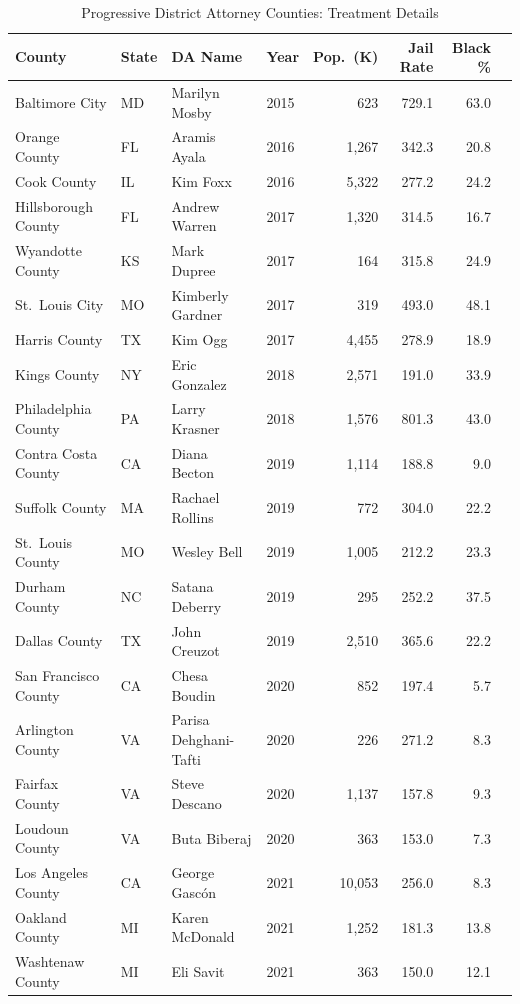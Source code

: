 \begin{table}[ht]
\centering
\small
\caption{Progressive District Attorney Counties: Treatment Details}
\label{tab:treatment}
\begin{tabular}{llllrrrr}
\toprule
County & State & DA Name & Year & Pop.\ (K) & Jail Rate & Black \% \\
\midrule
Baltimore City & MD & Marilyn Mosby & 2015 & 623 & 729.1 & 63.0 \\
Orange County & FL & Aramis Ayala & 2016 & 1,267 & 342.3 & 20.8 \\
Cook County & IL & Kim Foxx & 2016 & 5,322 & 277.2 & 24.2 \\
Hillsborough County & FL & Andrew Warren & 2017 & 1,320 & 314.5 & 16.7 \\
Wyandotte County & KS & Mark Dupree & 2017 & 164 & 315.8 & 24.9 \\
St.\ Louis City & MO & Kimberly Gardner & 2017 & 319 & 493.0 & 48.1 \\
Harris County & TX & Kim Ogg & 2017 & 4,455 & 278.9 & 18.9 \\
Kings County & NY & Eric Gonzalez & 2018 & 2,571 & 191.0 & 33.9 \\
Philadelphia County & PA & Larry Krasner & 2018 & 1,576 & 801.3 & 43.0 \\
Contra Costa County & CA & Diana Becton & 2019 & 1,114 & 188.8 & 9.0 \\
Suffolk County & MA & Rachael Rollins & 2019 & 772 & 304.0 & 22.2 \\
St.\ Louis County & MO & Wesley Bell & 2019 & 1,005 & 212.2 & 23.3 \\
Durham County & NC & Satana Deberry & 2019 & 295 & 252.2 & 37.5 \\
Dallas County & TX & John Creuzot & 2019 & 2,510 & 365.6 & 22.2 \\
San Francisco County & CA & Chesa Boudin & 2020 & 852 & 197.4 & 5.7 \\
Arlington County & VA & Parisa Dehghani-Tafti & 2020 & 226 & 271.2 & 8.3 \\
Fairfax County & VA & Steve Descano & 2020 & 1,137 & 157.8 & 9.3 \\
Loudoun County & VA & Buta Biberaj & 2020 & 363 & 153.0 & 7.3 \\
Los Angeles County & CA & George Gasc\'on & 2021 & 10,053 & 256.0 & 8.3 \\
Oakland County & MI & Karen McDonald & 2021 & 1,252 & 181.3 & 13.8 \\
Washtenaw County & MI & Eli Savit & 2021 & 363 & 150.0 & 12.1 \\

\end{tabular}
\end{table}
